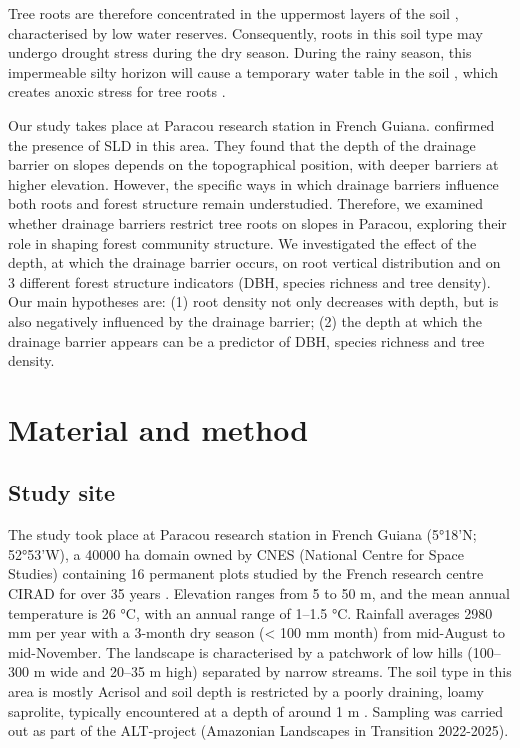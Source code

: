 \documentclass[fleqn,12pt]{latex/stylish_article} %
\begin{document}
Tree roots are therefore concentrated in the uppermost layers of the soil \citep{humbelCaracterisationParMesures1978}, characterised by low water reserves. Consequently, roots in this soil type may undergo drought stress during the dry season. During the rainy season, this impermeable silty horizon will cause a temporary water table in the soil \citep{humbelCaracterisationParMesures1978, pelissierWithinplotRelationshipsTree2002}, which creates anoxic stress for tree roots \citep{sabatierInfluenceSoilCover1997}.

Our study takes place at Paracou research station in French Guiana. \citet{epronSpatialVariationSoil2006} confirmed the presence of SLD in this area. They found that the depth of the drainage barrier on slopes depends on the topographical position, with deeper barriers at higher elevation. However, the specific ways in which drainage barriers influence both roots and forest structure remain understudied. Therefore, we examined whether drainage barriers restrict tree roots on slopes in Paracou, exploring their role in shaping forest community structure. We investigated the effect of the depth, at which the drainage barrier occurs, on root vertical distribution and on 3 different forest structure indicators (DBH, species richness and tree density). Our main hypotheses are: (1) root density not only decreases with depth, but is also negatively influenced by the drainage barrier; (2) the depth at which the drainage barrier appears can be a predictor of DBH, species richness and tree density.

\hypertarget{material-and-method}{%
\section{Material and method}\label{material-and-method}}

\hypertarget{study-site}{%
\subsection{Study site}\label{study-site}}

The study took place at Paracou research station in French Guiana (5°18'N; 52°53'W), a 40000 ha domain owned by CNES (National Centre for Space Studies) containing 16 permanent plots studied by the French research centre CIRAD for over 35 years . Elevation ranges from 5 to 50 m, and the mean annual temperature is 26 °C, with an annual range of 1--1.5 °C. Rainfall averages 2980 mm per year with a 3-month dry season (\textless{} 100 mm month) from mid-August to mid-November. The landscape is characterised by a patchwork of low hills (100--300 m wide and 20--35 m high) separated by narrow streams. The soil type in this area is mostly Acrisol \citep{iussworkinggroupwrbWorldReferenceBase2022} and soil depth is restricted by a poorly draining, loamy saprolite, typically encountered at a depth of around 1 m \citep{epronSpatialVariationSoil2006}.
Sampling was carried out as part of the ALT-project (Amazonian Landscapes in Transition 2022-2025).
\end{document}
